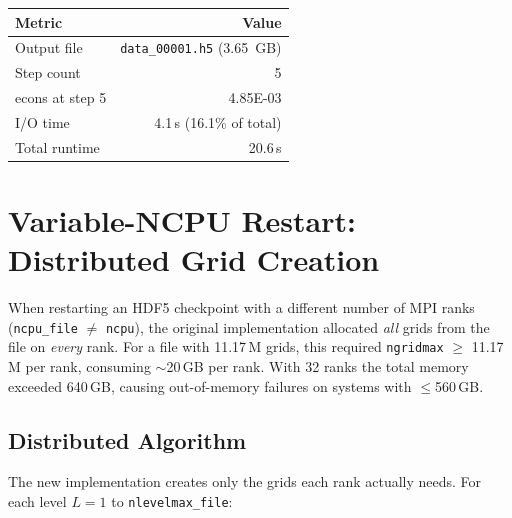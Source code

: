 \documentclass[11pt,fleqn]{book}
\begin{document}
\begin{center}
\begin{tabular}{lr}
\toprule
\textbf{Metric} & \textbf{Value} \\
\midrule
Output file & \texttt{data\_00001.h5} (3.65~GB) \\
Step count & 5 \\
econs at step 5 & 4.85E-03 \\
I/O time & 4.1\,s (16.1\% of total) \\
Total runtime & 20.6\,s \\
\bottomrule
\end{tabular}
\end{center}


\section{Variable-NCPU Restart: Distributed Grid Creation}
\label{sec:varcpu-dist}

When restarting an HDF5 checkpoint with a different number of MPI ranks (\texttt{ncpu\_file} $\neq$ \texttt{ncpu}), the original implementation allocated \emph{all} grids from the file on \emph{every} rank.  For a file with 11.17\,M grids, this required \texttt{ngridmax} $\geq$ 11.17\,M per rank, consuming $\sim$20\,GB per rank.  With 32 ranks the total memory exceeded 640\,GB, causing out-of-memory failures on systems with $\leq$560\,GB.

\subsection{Distributed Algorithm}

The new implementation creates only the grids each rank actually needs.  For each level $L = 1$ to \texttt{nlevelmax\_file}:
\end{document}
